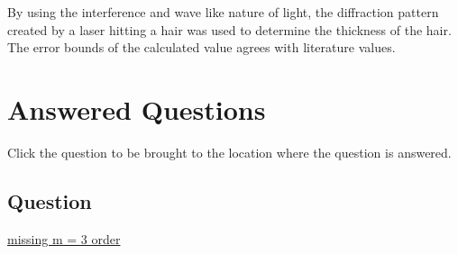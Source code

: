 \documentclass{report}
\begin{document}
By using the interference and wave like nature of light, the diffraction pattern created by a laser hitting a hair was used to determine the thickness of the hair. The error bounds of the calculated value agrees with literature values.  




\chapter{Answered Questions}
Click the question to be brought to the location where the question is answered.

\section{Question}
\hyperref[Question]{missing m = 3 order}
\end{document}
